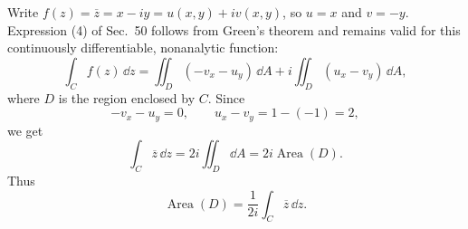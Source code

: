 \documentclass[11pt,oneside]{article}
\begin{document}
\begin{solution}
Write $f(z)=\overline z=x-iy=u(x, y)+iv(x, y)$, so $u=x$ and $v=-y$. Expression (4) of Sec.~50 follows from Green's theorem and remains valid for this continuously differentiable, nonanalytic function:
\[
    \int_C f(z)\,\dd z
     =\iint_D(-v_x-u_y)\,\dd A
      +i\iint_D(u_x-v_y)\,\dd A,
\]
where $D$ is the region enclosed by $C$. Since
\[
    -v_x-u_y=0, \qquad u_x-v_y=1-(-1)=2,
\]
we get
\[
    \int_C\overline z\,\dd z
      =2i\iint_D\dd A=2i\operatorname{Area}(D).
\]
Thus
\[
    \boxed{\operatorname{Area}(D)=\frac1{2i}\int_C\overline z\,\dd z.}
\]
\end{solution}
\end{document}
